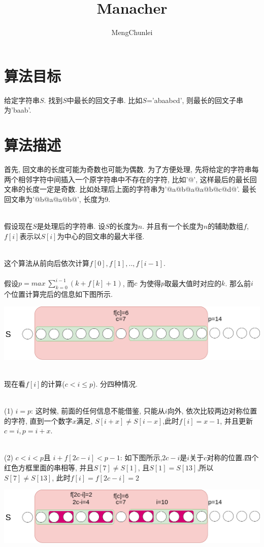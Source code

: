 \documentclass{article}
\title{Manacher}
\author{MengChunlei}
\begin{document}
\maketitle
\section{算法目标}
给定字符串$S$. 找到$S$中最长的回文子串. 比如$S$='abaabcd', 则最长的回文子串为'baab'. \par
\section{算法描述}
首先, 回文串的长度可能为奇数也可能为偶数. 为了方便处理, 先将给定的字符串每两个相邻字符中间插入一个原字符串中不存在的字符, 比如'@', 这样最后的最长回文串的长度一定是奇数. 比如处理后上面的字符串为'@a@b@a@a@b@c@d@'. 最长回文串为'@b@a@a@b@', 长度为9. \par
~\\
假设现在$S$是处理后的字符串. 设$S$的长度为$n$. 并且有一个长度为$n$的辅助数组$f$, $f[i]$表示以$S[i]$为中心的回文串的最大半径. \par
~\\
这个算法从前向后依次计算$f[0],f[1],..,f[i-1]$.
~\\~\\
假设$p=max\ \sum_{k=0}^{i-1}(k+f[k]+1)$, 而$c$ 为使得$p$取最大值时对应的$k$. 那么前$i$个位置计算完后的信息如下图所示. \par
\includegraphics[scale=0.39]{pic1.png} \par
~\\
现在看$f[i]$的计算($c < i\le p$). 分四种情况.\par
~\\
(1) $i= p$: 这时候, 前面的任何信息不能借鉴, 只能从$i$向外, 依次比较两边对称位置的字符, 直到一个数字$x$满足, $S[i+x]\ne S[i-x]$,此时$f[i]=x-1$, 并且更新$c=i,p=i+x$. \par
~\\
(2) $c<i<p$且 $i+f[2c-i]<p-1$: 如下图所示,$2c-i$是$i$关于$c$对称的位置.四个红色方框里面的串相等, 并且$S[7]\ne S[1]$, 且$S[1]=S[13]$,所以$S[7]\ne S[13]$, 此时$f[i]=f[2c-i]=2$\par
\includegraphics[scale=0.39]{pic2.png} \par
\end{document}
